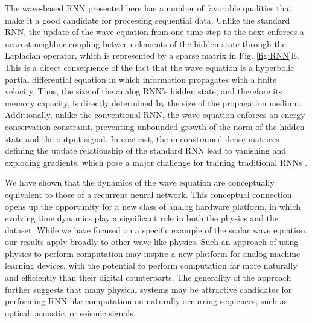 The wave-based RNN presented here has a number of favorable qualities that make it a good candidate for processing sequential data.
Unlike the standard RNN, the update of the wave equation from one time step to the next enforces a nearest-neighbor coupling between elements of the hidden state through the Laplacian operator, which is represented by a sparse matrix in Fig. \ref{fig:RNN}E. 
This is a direct consequence of the fact that the wave equation is a hyperbolic partial differential equation in which information propagates with a finite velocity. 
Thus, the size of the analog RNN's hidden state, and therefore its memory capacity, is directly determined by the size of the propagation medium. 
Additionally, unlike the conventional RNN, the wave equation enforces an energy conservation constraint, preventing unbounded growth of the norm of the hidden state and the output signal.
In contrast, the unconstrained dense matrices defining the update relationship of the standard RNN lead to vanishing and exploding gradients, which pose a major challenge for training traditional RNNs \cite{jing2017tunable}.

We have shown that the dynamics of the wave equation are conceptually equivalent to those of a recurrent neural network.
This conceptual connection opens up the opportunity for a new class of analog hardware platform, in which evolving time dynamics play a significant role in both the physics and the dataset.
While we have focused on a specific example of the scalar wave equation, our results apply broadly to other wave-like physics.
Such an approach of using physics to perform computation \cite{silva_performing_2014, hermans_trainable_2015, guo_photonic_2018, lin2018all, kwon_nonlocal_2018, estakhri_inverse-designed_2019} may inspire a new platform for analog machine learning devices, with the potential to perform computation far more naturally and efficiently than their digital counterparts.
The generality of the approach further suggests that many physical systems may be attractive candidates for performing RNN-like computation on naturally occurring sequences, such as optical, acoustic, or seismic signals.
